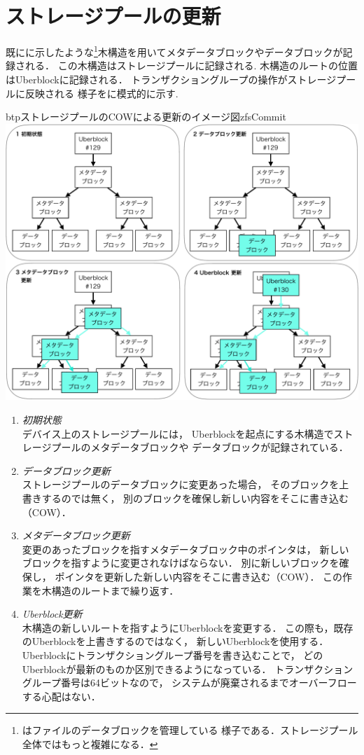 \section{ストレージプールの更新}
既にに示したような\footnote{
  はファイルのデータブロックを管理している
  様子である．ストレージプール全体ではもっと複雑になる．
}木構造を用いてメタデータブロックやデータブロックが記録される．
この木構造はストレージプールに記録される.
木構造のルートの位置はUberblockに記録される．
トランザクショングループの操作がストレージプールに反映される
様子をに模式的に示す.

\begin{myfig}{btp}{ストレージプールのCOWによる更新のイメージ図}{zfsCommit}
  \centering\includegraphics[scale=0.6]{Fig/zfsCommit-crop.pdf}
\end{myfig}

\begin{enumerate}
\item \emph{初期状態} \\
  デバイス上のストレージプールには，
  Uberblockを起点にする木構造でストレージプールのメタデータブロックや
  データブロックが記録されている．
\item \emph{データブロック更新} \\
  ストレージプールのデータブロックに変更あった場合，
  そのブロックを上書きするのでは無く，
  別のブロックを確保し新しい内容をそこに書き込む（COW）．
\item \emph{メタデータブロック更新} \\
  変更のあったブロックを指すメタデータブロック中のポインタは，
  新しいブロックを指すように変更されなけばならない．
  別に新しいブロックを確保し，
  ポインタを更新した新しい内容をそこに書き込む（COW）．
  この作業を木構造のルートまで繰り返す．
\item \emph{Uberblock更新} \\
  木構造の新しいルートを指すようにUberblockを変更する．
  この際も，既存のUberblockを上書きするのではなく，
  新しいUberblockを使用する．
  Uberblockにトランザクショングループ番号を書き込むことで，
  どのUberblockが最新のものか区別できるようになっている．
  トランザクショングループ番号は64ビットなので，
  システムが廃棄されるまでオーバーフローする心配はない．
\end{enumerate}

